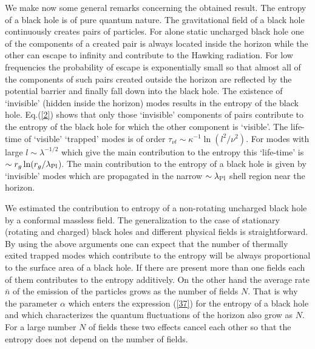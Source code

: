\documentclass[superscriptaddress,showpacs,preprintnumbers,amsmath,amssymb,
nofootinbib,twocolumn,aps,prd,10pt]{revtex4-1}
\begin{document}
We make now some general remarks concerning the obtained result.   The
entropy  of   a  black   hole   is   of  pure   quantum  nature.   The
gravitational  field  of  a  black  hole continuously creates pairs of
particles. For alone static uncharged black hole one of the components
of a created pair is always located inside the horizon while the other
can escape  to  infinity  and  contribute  to  the  Hawking radiation.
For low frequencies the probability of escape is exponentially small so
that almost all of the components of such pairs created outside  the
horizon are reflected by  the potential barrier  and finally   fall
down  into the  black hole.  The existence of `invisible'  (hidden
inside the  horizon) modes results  in the  entropy  of  the  black
hole.  Eq.(\ref{2})  shows  that  only   those `invisible' components of
pairs contribute to the entropy of the black hole for  which the  other
component  is `visible'.  The life-time  of `visible' `trapped' modes
is of   order $\tau_{\nu l}\sim \kappa  ^{-1}\ln (l^2  /\nu ^2 )$. For
modes with  large $l\sim   \lambda  ^{-1/2}$ which give   the  main
contribution to the entropy    this `life-time' is  $\sim r_g  \ln (r_g
/\lambda  _{\mbox{\scriptsize{Pl}}}$). The  main   contribution to
the entropy of a black
hole is given by  `invisible' modes which are propagated in  the narrow
$\sim  \lambda _{\mbox{\scriptsize{Pl}}}$ shell region  near the horizon.

We estimated the contribution  to entropy of a  non-rotating uncharged
black hole by  a conformal massless  field. The generalization  to the
case  of  stationary (rotating and charged) black   holes  and
different physical fields  is straightforward. By using the above
arguments one can expect that  the number  of thermally exited trapped
modes  which  contribute  to  the entropy will be always proportional
to the surface area of a black hole.  If there are present more than one
fields each of them contributes to the entropy  additively.  On the other
hand  the average rate $\bar{n}$  of the emission of  the particles
grows as  the number  of fields $N$. That is why the parameter $\alpha$
which enters the expression (\ref{37}) for the entropy of a black hole
and which characterizes the quantum
fluctuations of the horizon also grow as $N$.  For a large number $N$
of fields these two  effects cancel each  other so that  the entropy
does not depend on the number of fields.
\end{document}
